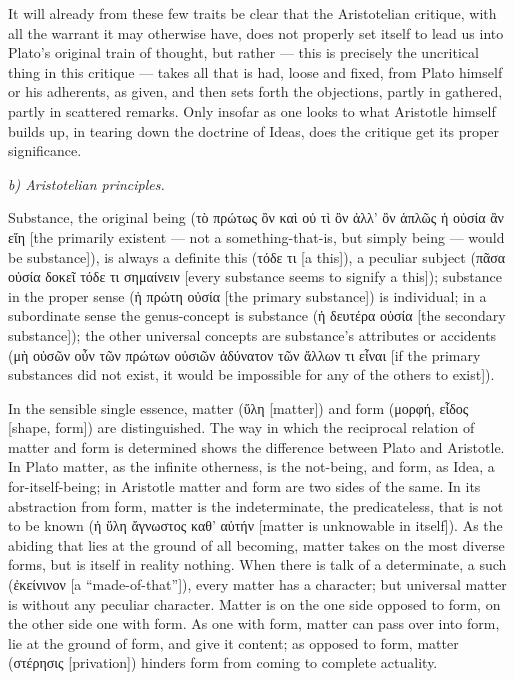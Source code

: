 \documentclass[12pt]{book}
\begin{document}
It will already from these few traits be clear that the Aristotelian critique, with all the warrant it
may otherwise have, does not properly set itself to lead us into Plato's original train of thought, but
rather — this is precisely the
uncritical thing in this critique — takes all that is had, loose and fixed, from Plato himself or
his adherents, as given, and then sets forth the objections, partly in gathered, partly in
scattered remarks. Only insofar as one looks to what Aristotle himself builds up, in tearing down
the doctrine of Ideas, does the critique get its proper significance.

\emph{b) Aristotelian principles.}

Substance, the original being (τὸ πρώτως ὂν καὶ οὐ τὶ ὂν ἀλλ' ὂν ἁπλῶς ἡ οὐσία ἂν εἴη [the
primarily existent — not a something-that-is, but simply being — would be substance]), is always a
definite this (τόδε τι [a this]), a peculiar subject (πᾶσα οὐσία δοκεῖ τόδε τι σημαίνειν [every
substance seems to signify a this]); substance in the proper sense (ἡ πρώτη οὐσία [the primary
substance]) is individual; in a subordinate sense the genus-concept is substance (ἡ δευτέρα οὐσία
[the secondary substance]); the other universal concepts are substance's attributes or accidents
(μὴ οὐσῶν οὖν τῶν πρώτων οὐσιῶν ἀδύνατον τῶν ἄλλων τι εἶναι [if the primary substances did not
exist, it would be impossible for any of the others to exist]).

In the sensible single essence, matter (ὕλη [matter]) and form (μορφή, εἶδος [shape, form]) are
distinguished. The way in which the reciprocal relation of matter and form is determined shows the
difference between Plato and Aristotle. In Plato matter, as the infinite otherness, is the
not-being, and form, as Idea, a for-itself-being; in Aristotle matter and form are two sides of the
same. In its abstraction from form, matter is the indeterminate, the predicateless, that is not to
be known (ἡ ὕλη ἄγνωστος καθ' αὑτήν [matter is unknowable in itself]). As the abiding that lies at
the ground of all becoming, matter takes on the most diverse forms, but is itself in reality
nothing. When there is talk of a determinate, a such (ἐκείνινον [a ``made-of-that'']), every matter
has a character; but universal matter is without any
peculiar character. Matter is on the one side opposed to form, on the other side one with form. As
one with form, matter can pass over into form, lie at the ground of form, and give it content; as
opposed to form, matter (στέρησις [privation]) hinders form from coming to complete actuality.
\end{document}

